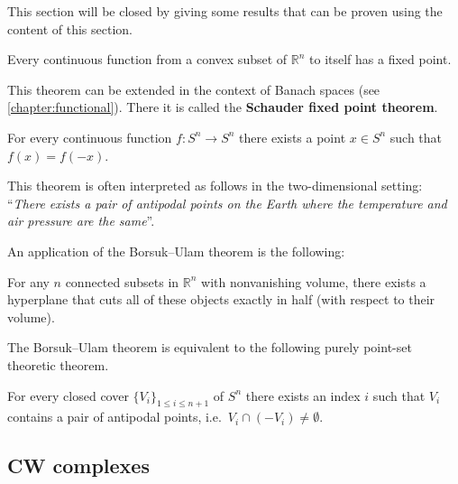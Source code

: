     This section will be closed by giving some results that can be proven using the content of this section.
    \begin{theorem}
        Every continuous function from a convex subset of $\mathbb{R}^n$ to itself has a fixed point.
    \end{theorem}
    This theorem can be extended in the context of Banach spaces (see \cref{chapter:functional}). There it is called the \textbf{Schauder fixed point theorem}.

    \begin{theorem}
        For every continuous function $f:S^n\rightarrow S^n$ there exists a point $x\in S^n$ such that $f(x)=f(-x)$.
    \end{theorem}
    This theorem is often interpreted as follows in the two-dimensional setting: ``\textit{There exists a pair of antipodal points on the Earth where the temperature and air pressure are the same}''.

    An application of the Borsuk--Ulam theorem is the following:
    \begin{theorem}
        For any $n$ connected subsets in $\mathbb{R}^n$ with nonvanishing volume, there exists a hyperplane that cuts all of these objects exactly in half (with respect to their volume).
    \end{theorem}

    The Borsuk--Ulam theorem is equivalent to the following purely point-set theoretic theorem.
    \begin{theorem}
        For every closed cover $\{V_i\}_{1\leq i\leq n+1}$ of $S^n$ there exists an index $i$ such that $V_i$ contains a pair of antipodal points, i.e.~$V_i\cap(-V_i)\neq\emptyset$.
    \end{theorem}

\subsection{CW complexes}


